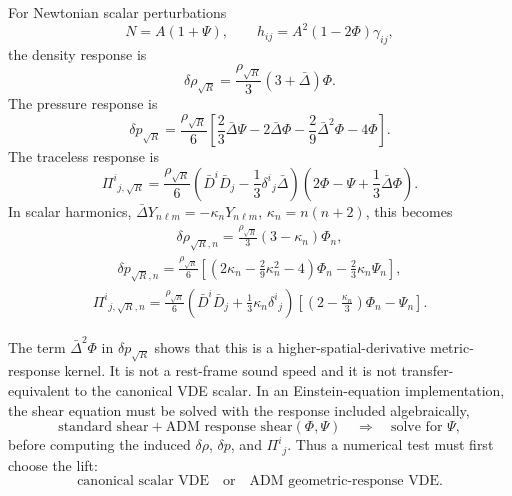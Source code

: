 \documentclass[11pt,a4paper]{article}
\numberwithin{equation}{section}
\theoremstyle{definition}
\theoremstyle{plain}
\theoremstyle{remark}
\begin{document}
For Newtonian scalar perturbations
\begin{equation}
N=A(1+\Psi),
\qquad
h_{ij}=A^2(1-2\Phi)\gamma_{ij},
\end{equation}
the density response is
\begin{equation}
\boxed{
\delta\rho_{\sqrt R}
=
\frac{\rho_{\sqrt R}}3(3+\bar\Delta)\Phi.
}
\end{equation}
The pressure response is
\begin{equation}
\boxed{
\delta p_{\sqrt R}
=
\frac{\rho_{\sqrt R}}6
\left[
\frac23\bar\Delta\Psi
-2\bar\Delta\Phi
-\frac29\bar\Delta^2\Phi
-4\Phi
\right].
}
\end{equation}
The traceless response is
\begin{equation}
\boxed{
\Pi^i{}_{j,\sqrt R}
=
\frac{\rho_{\sqrt R}}6
\left(
\bar D^i\bar D_j
-\frac13\delta^i{}_j\bar\Delta
\right)
\left(
2\Phi-\Psi+\frac13\bar\Delta\Phi
\right).
}
\end{equation}
In scalar harmonics, \(\bar\Delta Y_{n\ell m}=-\kappa_nY_{n\ell m}\), \(\kappa_n=n(n+2)\), this becomes
\begin{align}
\boxed{
\delta\rho_{\sqrt R,n}
=
\frac{\rho_{\sqrt R}}3(3-\kappa_n)\Phi_n,
}\end{align}
\begin{align}
\boxed{
\delta p_{\sqrt R,n}
=
\frac{\rho_{\sqrt R}}6
\left[
\left(2\kappa_n-\frac29\kappa_n^2-4\right)\Phi_n
-\frac23\kappa_n\Psi_n
\right],
}\end{align}
\begin{align}
\boxed{
\Pi^i{}_{j,\sqrt R,n}
=
\frac{\rho_{\sqrt R}}6
\left(
\bar D^i\bar D_j
+\frac13\kappa_n\delta^i{}_j
\right)
\left[
\left(2-\frac{\kappa_n}{3}\right)\Phi_n-\Psi_n
\right].
}\end{align}

The term \(\bar\Delta^2\Phi\) in \(\delta p_{\sqrt R}\) shows that this is a higher-spatial-derivative metric-response kernel.  It is not a rest-frame sound speed and it is not transfer-equivalent to the canonical VDE scalar.  In an Einstein-equation implementation, the shear equation must be solved with the response included algebraically,
\begin{equation}
\text{standard shear}+\text{ADM response shear}(\Phi,\Psi)
\quad\Rightarrow\quad
\text{solve for }\Psi,
\end{equation}
before computing the induced \(\delta\rho\), \(\delta p\), and \(\Pi^i{}_j\).  Thus a numerical test must first choose the lift:
\begin{equation}
\boxed{
\text{canonical scalar VDE}
\quad\text{or}\quad
\text{ADM geometric-response VDE}.}
\end{equation}
\end{document}
